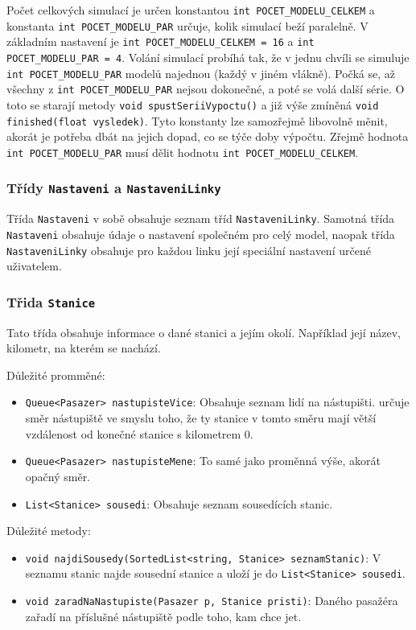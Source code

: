 \documentclass[12pt, a4paper]{article}
\begin{document}
Počet celkových simulací je určen konstantou \texttt{int POCET\_MODELU\_CELKEM} a konstanta \texttt{int POCET\_MODELU\_PAR} určuje, kolik simulací beží paralelně. V základním nastavení je  \texttt{int POCET\_MODELU\_CELKEM = 16} a \texttt{int POCET\_MODELU\_PAR = 4}. Volání simulací probíhá tak, že v jednu chvíli se simuluje \texttt{int POCET\_MODELU\_PAR} modelů najednou (každý v jiném vlákně). Počká se, až všechny z \texttt{int POCET\_MODELU\_PAR} nejsou dokonečné, a poté se volá další série. O toto se starají metody \texttt{void spustSeriiVypoctu()} a již výše zmíněná \texttt{void finished(float vysledek)}. Tyto konstanty lze samozřejmě libovolně měnit, akorát je potřeba dbát na jejich dopad, co se týče doby výpočtu. Zřejmě hodnota \texttt{int POCET\_MODELU\_PAR} musí dělit hodnotu \texttt{int POCET\_MODELU\_CELKEM}.

\subsubsection{Třídy \texttt{Nastaveni} a \texttt{NastaveniLinky}}
Třída \texttt{Nastaveni} v sobě obsahuje seznam tříd \texttt{NastaveniLinky}. Samotná třída \texttt{Nastaveni} obsahuje údaje o nastavení společném pro celý model, naopak třída \texttt{NastaveniLinky} obsahuje pro každou linku její speciální nastavení určené uživatelem.

\subsubsection{Třida \texttt{Stanice}}
Tato třída obsahuje informace o dané stanici a jejím okolí. Například její název, kilometr, na kterém se nachází.

Důležité promměné:
\begin{itemize}
    \item{\texttt{Queue<Pasazer> nastupisteVice}}: Obsahuje seznam lidí na nástupišti.  určuje směr nástupiště ve smyslu toho, že ty stanice v tomto směru mají větší vzdálenost od konečné stanice s kilometrem 0.
    \item{\texttt{Queue<Pasazer> nastupisteMene}}: To samé jako proměnná výše, akorát opačný směr.
    \item{\texttt{List<Stanice> sousedi}}: Obsahuje seznam sousedících stanic.
\end{itemize}

Důležité metody:
\begin{itemize}
    \item{\texttt{void najdiSousedy(SortedList<string, Stanice> seznamStanic)}}: V seznamu stanic najde sousední stanice a uloží je do \texttt{List<Stanice> sousedi}.
    \item{\texttt{void zaradNaNastupiste(Pasazer p, Stanice pristi)}}: Daného pasažéra zařadí na příslušné nástupiště podle toho, kam chce jet.
\end{itemize}
\end{document}
